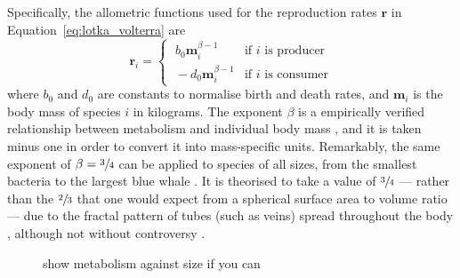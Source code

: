 Specifically, the allometric functions used for the reproduction rates $\mathbf{r}$ in Equation~\eqref{eq:lotka_volterra} are
\begin{equation}
  \mathbf{r}_i =
  \begin{cases}
    \;b_0\mathbf{m}_i^{\beta-1} & \text{if $i$ is producer}\\
    \;-d_0\mathbf{m}_i^{\beta-1} & \text{if $i$ is consumer}
  \end{cases}
  \label{eq:metabolism_beta}
\end{equation}
where $b_0$ and $d_0$ are constants to normalise birth and death rates, and $\mathbf{m}_i$ is the body mass of species $i$ in kilograms. The exponent $\beta$ is a empirically verified relationship between metabolism and individual body mass \cite{Brown2004}, and it is taken minus one in order to convert it into mass-specific units.
Remarkably, the same exponent of $\beta=\sfrac{3}{4}$ can be applied to species of all sizes, from the smallest bacteria to the largest blue whale \cite{Kleiber1047}. It is theorised to take a value of $\sfrac{3}{4}$ --- rather than the $\sfrac{2}{3}$ that one would expect from a spherical surface area to volume ratio --- due to the fractal pattern of tubes (such as veins) spread throughout the body \cite{West1997}, although not without controversy \cite{Agutter2004}.

\begin{figure}
    \caption[A plot of metabolism against individual body mass]{show metabolism against size if you can}
    \label{fig:metabolism}
\end{figure}

